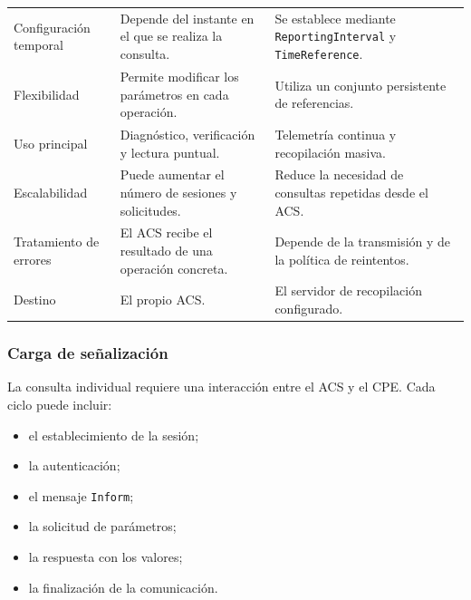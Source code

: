 \begin{table}[H]
\begin{tabular}{
        p{}
        p{}
        p{}
    }
        Configuración temporal
        &
        Depende del instante en el que se realiza la consulta.
        &
        Se establece mediante
        \texttt{ReportingInterval} y
        \texttt{TimeReference}.
        \\

        Flexibilidad
        &
        Permite modificar los parámetros en cada operación.
        &
        Utiliza un conjunto persistente de referencias.
        \\

        Uso principal
        &
        Diagnóstico, verificación y lectura puntual.
        &
        Telemetría continua y recopilación masiva.
        \\

        Escalabilidad
        &
        Puede aumentar el número de sesiones y solicitudes.
        &
        Reduce la necesidad de consultas repetidas desde el ACS.
        \\

        Tratamiento de errores
        &
        El ACS recibe el resultado de una operación concreta.
        &
        Depende de la transmisión y de la política de reintentos.
        \\

        Destino
        &
        El propio ACS.
        &
        El servidor de recopilación configurado.
        \\

        \hline
    \end{tabular}
\end{table}


\subsubsection*{Carga de señalización}

La consulta individual requiere una interacción entre el ACS y el CPE.
Cada ciclo puede incluir:

\begin{itemize}
    \item el establecimiento de la sesión;
    \item la autenticación;
    \item el mensaje \texttt{Inform};
    \item la solicitud de parámetros;
    \item la respuesta con los valores;
    \item la finalización de la comunicación.
\end{itemize}

